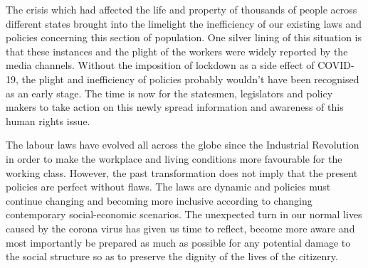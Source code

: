\begin{multicols}{2}
\noi
The crisis which had affected the life and property of thousands of people across different
states brought into the limelight the inefficiency of our existing laws and policies concerning
this section of population. One silver lining of this situation is that these instances and the
plight of the workers were widely reported by the media channels. Without the imposition of
lockdown as a side effect of COVID-19, the plight and inefficiency of policies probably
wouldn’t have been recognised as an early stage. The time is now for the statesmen, legislators and policy makers to take action on this newly spread information and awareness
of this human rights issue. 

\noi
The labour laws have evolved all across the globe since the Industrial Revolution in order to
make the workplace and living conditions more favourable for the working class. However,
the past transformation does not imply that the present policies are perfect without flaws. The
laws are dynamic and policies must continue changing and becoming more inclusive
according to changing contemporary social-economic scenarios. The unexpected turn in our
normal lives caused by the corona virus has given us time to reflect, become more aware and
most importantly be prepared as much as possible for any potential damage to the social
structure so as to preserve the dignity of the lives of the citizenry.


\end{multicols}
